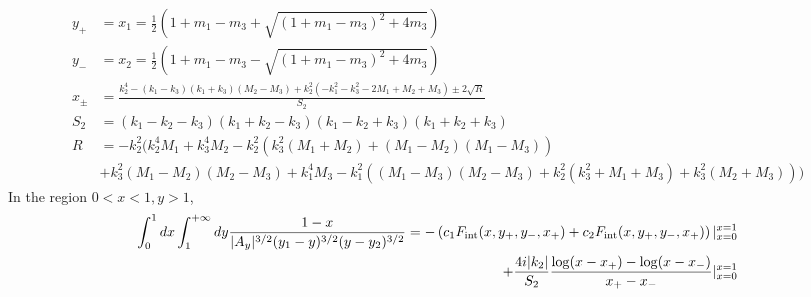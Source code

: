 \documentclass[twoside]{article}
\begin{document}
\begin{align}
  y_+ &=  x_1 = \frac{1}{2}\left( 1 + m_1 - m_3 + \sqrt{(1 + m_1 - m_3)^2 + 4m_3} \right)\\
  y_- &= x_2 = \frac{1}{2}\left( 1 + m_1 - m_3 - \sqrt{(1 + m_1 - m_3)^2 + 4m_3} \right)\\
  x_{\pm} &= \frac{k^4_2 - (k_1 - k_3)(k_1 + k_3)(M_2 - M_3) + k^2_2(-k^2_1 - k^2_3 - 2M_1 + M_2 + M_3) \pm 2\sqrt{R} }{S_2}\\
  S_2 &= (k_1 - k_2 - k_3)(k_1 + k_2 - k_3)(k_1 - k_2 + k_3)(k_1 + k_2 + k_3)\\
  R &=-k^2_2(k^4_2M_1 + k^4_3M_2 - k^2_2(k^2_3(M_1 + M_2) + (M_1 - M_2)(M_1 - M_3))\nonumber \\
  &+ k^2_3(M_1 - M_2)(M_2 - M_3) + k^4_1M_3 - k^2_1((M_1 - M_3)(M_2 - M_3) +k^2_2(k^2_3 + M_1 + M_3) + k^2_3(M_2 + M_3)))
\end{align}
In the region $0 < x < 1, y > 1$, 
\begin{align}
  \int^1_{0}dx \int^{+\infty}_{1}dy \frac{1-x}{|A_y|^{3/2}(y_1 - y)^{3/2}(y - y_2)^{3/2}} = -\left( c_1F_{\rm int}(x, y_+,y_-,x_+) +
  c_2F_{\rm int}(x, y_+, y_-,x_+) \right)\vert^{x = 1}_{x = 0} \nonumber \\
+ \frac{4i|k_2|}{S_2}\frac{\log(x-x_+) - \log(x - x_-)}{x_+ -x_-}\vert^{x = 1}_{x = 0}
\end{align}
\end{document}
